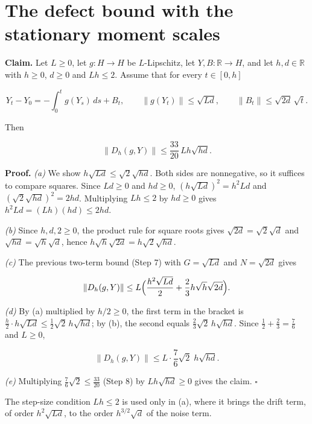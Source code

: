 \documentclass[11pt,a4paper]{article}
\begin{document}
\section{\texorpdfstring{The defect bound with the stationary moment scales}{The defect bound with the stationary moment scales}}


\textbf{Claim.} Let \(L\ge0\), let \(g:H\to H\) be \(L\)-Lipschitz, let \(Y,B:\mathbb R\to H\), and let \(h,d\in\mathbb R\) with \(h\ge0\), \(d\ge0\) and \(Lh\le2\). Assume that for every \(t\in[0,h]\)


\[Y_t-Y_0=-\int_0^tg(Y_s)\,ds+B_t,\qquad\|g(Y_t)\|\le\sqrt{Ld},\qquad\|B_t\|\le\sqrt{2d}\,\sqrt t.\]


Then


\[\|D_h(g,Y)\|\le\frac{33}{20}\,Lh\sqrt{hd}.\]


\textbf{Proof.} \emph{(a)} We show \(h\sqrt{Ld}\le\sqrt2\sqrt{hd}\). Both sides are nonnegative, so it suffices to compare squares. Since \(Ld\ge0\) and \(hd\ge0\), \((h\sqrt{Ld})^2=h^2Ld\) and \((\sqrt2\sqrt{hd})^2=2hd\). Multiplying \(Lh\le2\) by \(hd\ge0\) gives \(h^2Ld=(Lh)(hd)\le2hd\).




\emph{(b)} Since \(h,d,2\ge0\), the product rule for square roots gives \(\sqrt{2d}=\sqrt2\sqrt d\) and \(\sqrt{hd}=\sqrt h\sqrt d\), hence \(h\sqrt h\sqrt{2d}=h\sqrt2\sqrt{hd}\).




\emph{(c)} The previous two-term bound (Step 7) with \(G=\sqrt{Ld}\) and \(N=\sqrt{2d}\) gives


\[\|D_h(g,Y)\|\le L\Bigl(\frac{h^2\sqrt{Ld}}2+\frac23h\sqrt h\sqrt{2d}\Bigr).\]


\emph{(d)} By (a) multiplied by \(h/2\ge0\), the first term in the bracket is \(\frac h2\cdot h\sqrt{Ld}\le\frac12\sqrt2\,h\sqrt{hd}\); by (b), the second equals \(\frac23\sqrt2\,h\sqrt{hd}\). Since \(\frac12+\frac23=\frac76\) and \(L\ge0\),


\[\|D_h(g,Y)\|\le L\cdot\frac76\sqrt2\;h\sqrt{hd}.\]


\emph{(e)} Multiplying \(\frac76\sqrt2\le\frac{33}{20}\) (Step 8) by \(Lh\sqrt{hd}\ge0\) gives the claim. \(\square\)




The step-size condition \(Lh\le2\) is used only in (a), where it brings the drift term, of order \(h^2\sqrt{Ld}\), to the order \(h^{3/2}\sqrt d\) of the noise term.
\end{document}
